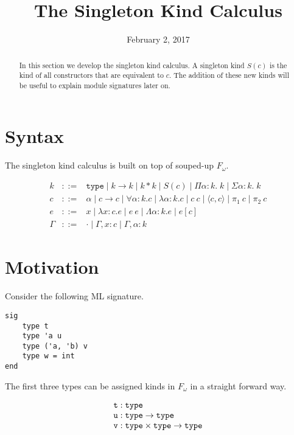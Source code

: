\documentclass{article}
\title{The Singleton Kind Calculus}
\date{February 2, 2017}
\newcommand{\type}{\ensuremath{\mathtt{type}}}
\begin{document}
\maketitle

\begin{abstract}
  In this section we develop the singleton kind calculus. A singleton kind
  $S(c)$ is the kind of all constructors that are equivalent to $c$. The
  addition of these new kinds will be useful to explain module signatures later
  on.
\end{abstract}

\section{Syntax}

The singleton kind calculus is built on top of souped-up $F_\omega$.

\[
  \begin{array}{lcl}
    k & ::= & \type \mid k \to k \mid k * k \mid S(c) \mid \Pi \alpha : k. \; k \mid \Sigma \alpha : k. \; k\\
    c & ::= & \alpha \mid c \to c \mid \forall \alpha : k. c
        \mid \lambda \alpha : k. c \mid c\ c \mid \langle c, c \rangle \mid \pi_1 \ c \mid \pi_2 \ c \\
    e & ::= & x \mid \lambda x : c. e \mid e\ e \mid
            \Lambda \alpha : k. e \mid e[c]\\
    \Gamma & ::= & \cdot \mid \Gamma, x : c \mid \Gamma, \alpha : k
  \end{array}
\]

\section{Motivation}

Consider the following ML signature.

\begin{verbatim}
sig
    type t
    type 'a u
    type ('a, 'b) v
    type w = int
end
\end{verbatim}

The first three types can be assigned kinds in $F_\omega$ in a straight forward
way.

\[
  \begin{array}{l}
    \verb|t| : \type \\
    \verb|u| : \type \to \type \\
    \verb|v| : \type \times \type \to \type
  \end{array}
\]
\end{document}
